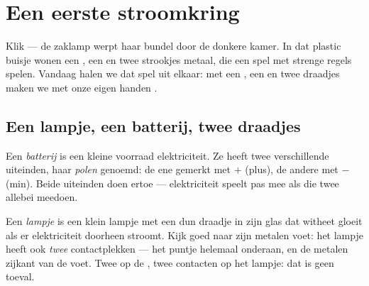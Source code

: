 \chapter{Een eerste stroomkring}\label{ch:g3:first-electric-circuit}

Klik --- de zaklamp werpt haar bundel door de donkere kamer. In dat
plastic buisje wonen een , een  en twee strookjes metaal,
die een spel met strenge regels spelen. Vandaag halen we dat spel uit
elkaar: met een , een  en twee draadjes maken we met onze
eigen handen .

\section{Een lampje, een batterij, twee draadjes}

\begin{definition}[De batterij]\label{def:g3:first-electric-circuit:battery}
Een \emph{batterij} is een kleine voorraad
elektriciteit. Ze heeft twee verschillende uiteinden, haar
\emph{polen} genoemd: de ene gemerkt met $+$ (plus), de
andere met $-$ (min). Beide uiteinden doen ertoe --- elektriciteit
speelt pas mee als die twee allebei meedoen.
\end{definition}

\begin{definition}\label{def:g3:first-electric-circuit:bulb}
Een \emph{lampje} is een klein lampje met een dun
draadje in zijn glas dat witheet gloeit als er elektriciteit
doorheen stroomt. Kijk goed naar zijn metalen voet: het lampje heeft
ook \emph{twee} contactplekken --- het puntje helemaal onderaan, en de
metalen zijkant van de voet. Twee  op de , twee
contacten op het lampje: dat is geen toeval.
\end{definition}

